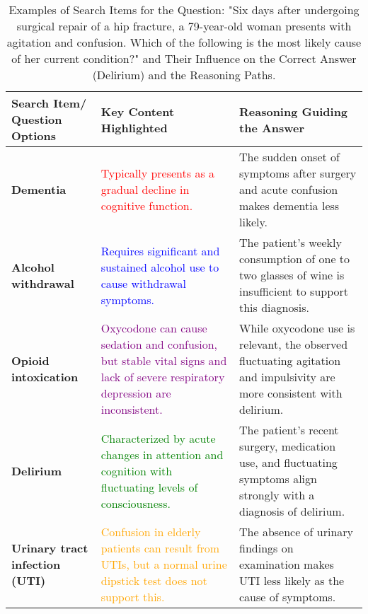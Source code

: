 \begin{table*}[h!]
\centering
\begin{tabular}{|p{3cm}|p{4cm}|p{4cm}|}
\hline
\textbf{Search Item/ Question Options} & \textbf{Key Content Highlighted} & \textbf{Reasoning Guiding the Answer} \\ \hline

\textbf{Dementia} &
\textcolor{red}{Typically presents as a gradual decline in cognitive function.} &
The sudden onset of symptoms after surgery and acute confusion makes dementia less likely. \\ \hline

\textbf{Alcohol withdrawal} &
\textcolor{blue}{Requires significant and sustained alcohol use to cause withdrawal symptoms.} &
The patient's weekly consumption of one to two glasses of wine is insufficient to support this diagnosis. \\ \hline

\textbf{Opioid intoxication} &
\textcolor{purple}{Oxycodone can cause sedation and confusion, but stable vital signs and lack of severe respiratory depression are inconsistent.} &
While oxycodone use is relevant, the observed fluctuating agitation and impulsivity are more consistent with delirium. \\ \hline

\textbf{Delirium} &
\textcolor{green}{Characterized by acute changes in attention and cognition with fluctuating levels of consciousness.} &
The patient's recent surgery, medication use, and fluctuating symptoms align strongly with a diagnosis of delirium. \\ \hline

\textbf{Urinary tract infection (UTI)} &
\textcolor{orange}{Confusion in elderly patients can result from UTIs, but a normal urine dipstick test does not support this.} &
The absence of urinary findings on examination makes UTI less likely as the cause of symptoms. \\ \hline

\end{tabular}
\caption{Examples of Search Items for the Question: "Six days after undergoing surgical repair of a hip fracture, a 79-year-old woman presents with agitation and confusion. Which of the following is the most likely cause of her current condition?" and Their Influence on the Correct Answer (Delirium) and the Reasoning Paths.}
\label{table:search_guidance_3}
\end{table*}

